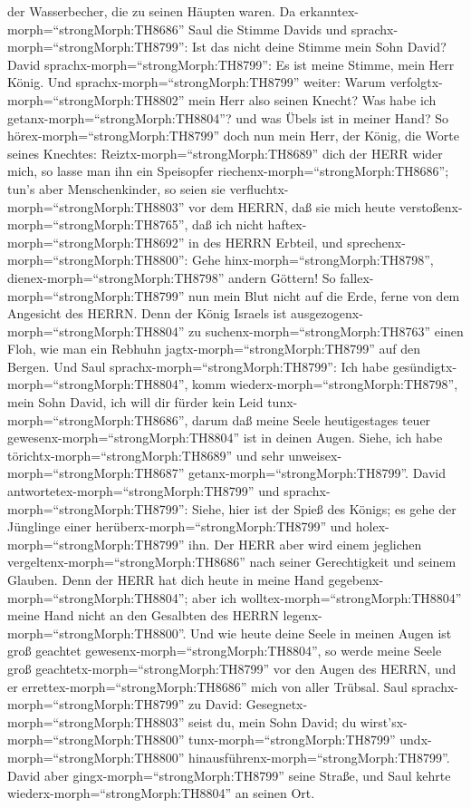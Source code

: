 der Wasserbecher, die zu seinen Häupten waren.  Da
erkanntex-morph=``strongMorph:TH8686'' Saul die Stimme Davids und
sprachx-morph=``strongMorph:TH8799'': Ist das nicht deine Stimme mein
Sohn David? David sprachx-morph=``strongMorph:TH8799'': Es ist meine
Stimme, mein Herr König.  Und
sprachx-morph=``strongMorph:TH8799'' weiter: Warum
verfolgtx-morph=``strongMorph:TH8802'' mein Herr also seinen Knecht? Was
habe ich getanx-morph=``strongMorph:TH8804''? und was Übels ist in
meiner Hand?  So hörex-morph=``strongMorph:TH8799'' doch
nun mein Herr, der König, die Worte seines Knechtes:
Reiztx-morph=``strongMorph:TH8689'' dich der HERR wider mich, so lasse
man ihn ein Speisopfer riechenx-morph=``strongMorph:TH8686''; tun's aber
Menschenkinder, so seien sie verfluchtx-morph=``strongMorph:TH8803'' vor
dem HERRN, daß sie mich heute verstoßenx-morph=``strongMorph:TH8765'',
daß ich nicht haftex-morph=``strongMorph:TH8692'' in des HERRN Erbteil,
und sprechenx-morph=``strongMorph:TH8800'': Gehe
hinx-morph=``strongMorph:TH8798'', dienex-morph=``strongMorph:TH8798''
andern Göttern!  So fallex-morph=``strongMorph:TH8799'' nun
mein Blut nicht auf die Erde, ferne von dem Angesicht des HERRN. Denn
der König Israels ist ausgezogenx-morph=``strongMorph:TH8804'' zu
suchenx-morph=``strongMorph:TH8763'' einen Floh, wie man ein Rebhuhn
jagtx-morph=``strongMorph:TH8799'' auf den Bergen.  Und
Saul sprachx-morph=``strongMorph:TH8799'': Ich habe
gesündigtx-morph=``strongMorph:TH8804'', komm
wiederx-morph=``strongMorph:TH8798'', mein Sohn David, ich will dir
fürder kein Leid tunx-morph=``strongMorph:TH8686'', darum daß meine
Seele heutigestages teuer gewesenx-morph=``strongMorph:TH8804'' ist in
deinen Augen. Siehe, ich habe törichtx-morph=``strongMorph:TH8689'' und
sehr unweisex-morph=``strongMorph:TH8687''
getanx-morph=``strongMorph:TH8799''.  David
antwortetex-morph=``strongMorph:TH8799'' und
sprachx-morph=``strongMorph:TH8799'': Siehe, hier ist der Spieß des
Königs; es gehe der Jünglinge einer
herüberx-morph=``strongMorph:TH8799'' und
holex-morph=``strongMorph:TH8799'' ihn.  Der HERR aber wird
einem jeglichen vergeltenx-morph=``strongMorph:TH8686'' nach seiner
Gerechtigkeit und seinem Glauben. Denn der HERR hat dich heute in meine
Hand gegebenx-morph=``strongMorph:TH8804''; aber ich
wolltex-morph=``strongMorph:TH8804'' meine Hand nicht an den Gesalbten
des HERRN legenx-morph=``strongMorph:TH8800''.  Und wie
heute deine Seele in meinen Augen ist groß geachtet
gewesenx-morph=``strongMorph:TH8804'', so werde meine Seele groß
geachtetx-morph=``strongMorph:TH8799'' vor den Augen des HERRN, und er
errettex-morph=``strongMorph:TH8686'' mich von aller Trübsal.
 Saul sprachx-morph=``strongMorph:TH8799'' zu David:
Gesegnetx-morph=``strongMorph:TH8803'' seist du, mein Sohn David; du
wirst'sx-morph=``strongMorph:TH8800'' tunx-morph=``strongMorph:TH8799''
undx-morph=``strongMorph:TH8800''
hinausführenx-morph=``strongMorph:TH8799''. David aber
gingx-morph=``strongMorph:TH8799'' seine Straße, und Saul kehrte
wiederx-morph=``strongMorph:TH8804'' an seinen Ort.

